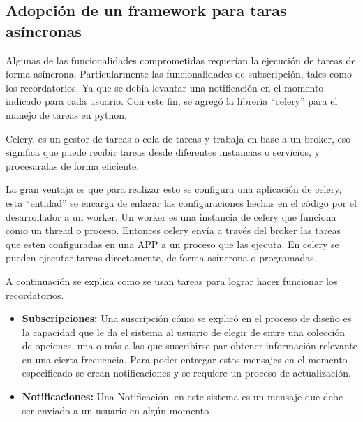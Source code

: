     \subsection{Adopción de un framework para taras asíncronas}
    \par Algunas de las funcionalidades comprometidas requerían la ejecución de tareas de forma asíncrona. Particularmente las funcionalidades de subscripción, tales como los recordatorios. Ya que se debía levantar una notificación en el momento indicado para cada usuario. Con este fin, se agregó la librería “celery” para el manejo de tareas en python.
    \par Celery, es un gestor de tareas o cola de tareas y trabaja en base a un broker, eso significa que puede recibir tareas desde diferentes instancias o servicios, y procesaralas de forma eficiente.
    \par La gran ventaja es que para realizar esto se configura una aplicación de celery, esta “entidad” se encarga de enlazar las configuraciones hechas en el código por el desarrollador a un worker. Un worker es una instancia de celery que funciona como un thread o proceso. Entonces celery envía a través del broker las tareas que esten configuradas en una APP a un proceso que las ejecuta. En celery se pueden ejecutar tareas directamente, de forma asíncrona o programadas.
    \par A continuación se explica como se usan tareas para lograr hacer funcionar los recordatorios.
    \begin{itemize}
        \item \textbf{Subscripciones:} Una suscripción cómo se explicó en el proceso de diseño es la capacidad que le da el sistema al usuario de elegir de entre una colección de opciones, una o más a las que suscribirse par obtener información relevante en una cierta frecuencia. Para poder entregar estos mensajes en el momento especificado se crean notificaciones y se requiere un proceso de actualización.
        \item \textbf{Notificaciones:} Una Notificación, en este sistema es un mensaje que debe ser enviado a un usuario en algún momento
    \end{itemize}

